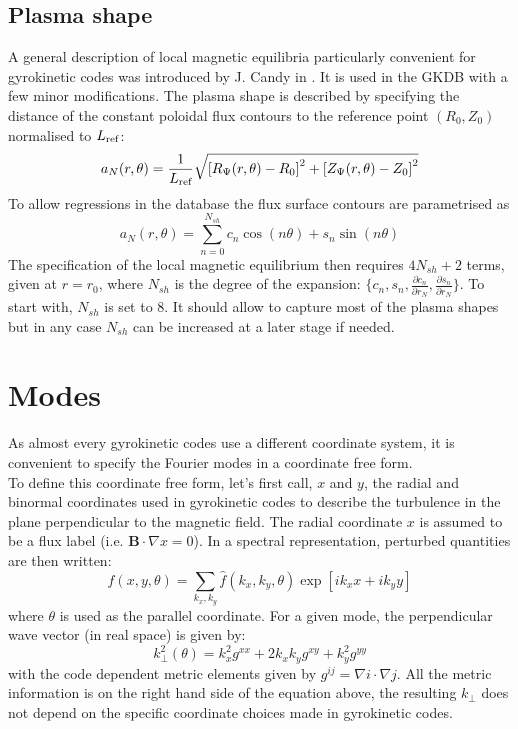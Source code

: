 \documentclass[fleqn]{report}
\begin{document}
\subsection{Plasma shape}
A general description of local magnetic equilibria particularly convenient for gyrokinetic codes was introduced by J. Candy in \cite {Candy:PPCF2009}. It is used in the GKDB with a few minor modifications.
The plasma shape is described by specifying the distance of the constant poloidal flux contours to the reference point $(R_0,Z_0)$  normalised to $L_{\textrm{ref}}$:
\begin{equation}
 a_N(r,\theta) = \frac{1}{L_{\textrm{ref}}}\sqrt{\left[R_{\Psi}(r,\theta)-R_0\right]^2 + \left[Z_{\Psi}(r,\theta)-Z_0\right]^2}
\end{equation}
To allow regressions in the database the flux surface contours are parametrised as 
\begin{equation}
 a_N(r,\theta) = \sum_{n=0}^{N_{sh}} c_n \cos(n\theta) + s_n \sin(n\theta)
\end{equation}
The specification of the local magnetic equilibrium then requires $4N_{sh}+2$ terms, given at $r=r_0$, where $N_{sh}$ is the degree of the expansion: $\{c_n,s_n,\frac{\partial c_n}{\partial r_N},\frac{\partial s_n}{\partial r_N}\}$. To start with, $N_{sh}$ is set to 8. It should allow to capture most of the plasma shapes but in any case $N_{sh}$ can be increased at a later stage if needed.\\

\section{Modes}
As almost every gyrokinetic codes use a different coordinate system, it is convenient to specify the Fourier modes in a coordinate free form.\\
To define this coordinate free form, let's first call, $x$ and $y$, the radial and binormal coordinates used in gyrokinetic codes to describe the turbulence in the plane perpendicular to the magnetic field. The radial coordinate $x$ is assumed to be a flux label (i.e. $\mathbf{B}\cdot \nabla x =0$).
In a spectral representation, perturbed quantities are then written:
\begin{equation}
 f(x,y,\theta) = \sum_{k_x,k_y} \hat{f}(k_x,k_y,\theta)\exp[ik_x x + ik_y y] 
\end{equation}
where $\theta$ is used as the parallel coordinate.
For a given mode, the perpendicular wave vector (in real space) is given by:
\begin{equation}
 k_\perp^2(\theta) = k_x^2 g^{xx} + 2k_xk_y g^{xy} + k_y^2g^{yy}
\end{equation}
with the code dependent metric elements given by $g^{ij}=\nabla i \cdot \nabla j$. All the metric information is on the right hand side of the equation above, the resulting $k_\perp$ does not depend on the specific coordinate choices made in gyrokinetic codes.
\end{document}
